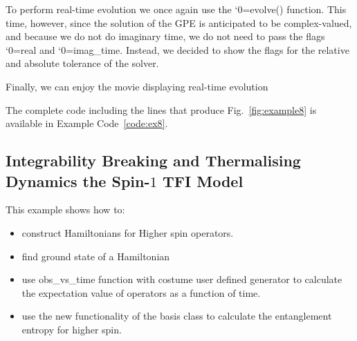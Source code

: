 \documentclass{SciPost}
\newcommand\0{\scalebox{-1}[1]{0}}
\let\svttfamily\ttfamily
\renewcommand\ttfamily{\svttfamily\catcode`0=\active }
\renewcommand\texttt{\bgroup\ttfamily\texttthelp}
\def\texttthelp#1{#1\egroup}
\newcommand{\GPcode}{example4.py}
\begin{document}

To perform real-time evolution we once again use the \texttt{evolve()} function. This time, however, since the solution of the GPE is anticipated to be complex-valued, and because we do not do imaginary time, we do not need to pass the flags \texttt{real} and \texttt{imag\_time}. Instead, we decided to show the flags for the relative and absolute tolerance of the solver. 

Finally, we can enjoy the movie displaying real-time evolution


The complete code including the lines that produce Fig.~\ref{fig:example8} is available in Example Code~\ref{code:ex8}.



\subsection{Integrability Breaking and Thermalising Dynamics the Spin-$1$ TFI Model}

This example shows how to:
\begin{itemize}
	\item construct Hamiltonians for Higher spin operators.
	\item find ground state of a Hamiltonian
	\item use obs\_vs\_time function with costume user defined generator to calculate the expectation value of operators as a function of time.
	\item use the new functionality of the basis class to calculate the entanglement entropy for higher spin.
\end{itemize}
\end{document}
